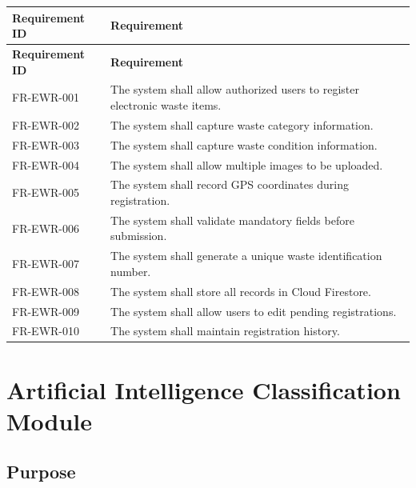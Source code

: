 \begin{longtable}{|p{3cm}|p{10.2cm}|}
\hline
\textbf{Requirement ID} & \textbf{Requirement} \\
\hline
\endfirsthead

\hline
\textbf{Requirement ID} & \textbf{Requirement} \\
\hline
\endhead

FR-EWR-001 &
The system shall allow authorized users to register electronic waste items.\\
\hline

FR-EWR-002 &
The system shall capture waste category information.\\
\hline

FR-EWR-003 &
The system shall capture waste condition information.\\
\hline

FR-EWR-004 &
The system shall allow multiple images to be uploaded.\\
\hline

FR-EWR-005 &
The system shall record GPS coordinates during registration.\\
\hline

FR-EWR-006 &
The system shall validate mandatory fields before submission.\\
\hline

FR-EWR-007 &
The system shall generate a unique waste identification number.\\
\hline

FR-EWR-008 &
The system shall store all records in Cloud Firestore.\\
\hline

FR-EWR-009 &
The system shall allow users to edit pending registrations.\\
\hline

FR-EWR-010 &
The system shall maintain registration history.\\
\hline

\end{longtable}

\section{Artificial Intelligence Classification Module}
\label{sec:ai-classification}

\subsection{Purpose}

